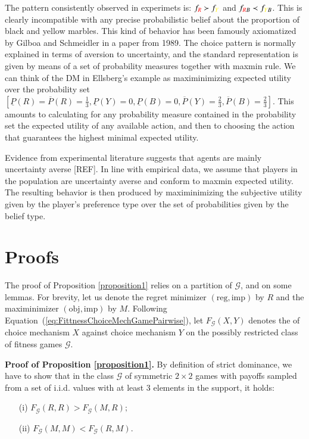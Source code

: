 \documentclass[fleqn,reqno,11pt]{article}
\begin{document}
The pattern consistently observed in experimets is:
$f_{{\color{red}R}} \succ f_{{\color{yellow}Y}}$ and
$f_{{\color{red}R}B} \prec f_{{\color{yellow}Y}B}$. This is clearly incompatible with any
precise probabilistic belief about the proportion of black and yellow marbles. This kind of
behavior has been famously axiomatized by Gilboa and Schmeidler in a paper from 1989. The
choice pattern is normally explained in terms of aversion to uncertainty, and the standard
representation is given by means of a set of probability measures together with maxmin rule. We
can think of the DM in Ellsberg's example as maximinimizing expected utility over the
probability set
$
[\underline{P}(R)=\overline{P}(R)=\frac{1}{3},\underline{P}(Y)=0,\underline{P}(B)=0,\overline{P}(Y)=\frac{2}{3},\overline{P}(B)=\frac{2}{3}]
$.
This amounts to calculating for any probability measure contained in the probability set the
expected utility of any available action, and then to choosing the action that guarantees the
highest minimal expected utility. 

Evidence from experimental literature suggests that agents are mainly uncertainty averse
[REF]. In line with empirical data, we assume that players in the population are uncertainty
averse and conform to maxmin expected utility. The resulting behavior is then produced by
maximinimizing the subjective utility given by the player's preference type over the set of
probabilities given by the belief type.


\section{Proofs}
\label{sec:proofs}

The proof of Proposition \ref{proposition1} relies on a partition of $\mathcal{G}$, and on some
lemmas. For brevity, let us denote the regret minimizer $(\text{reg}, \text{imp})$ by $R$ and
the maximinimizer $(\text{obj}, \text{imp})$ by $M$. Following
Equation~(\ref{eq:FittnessChoiceMechGamePairwise}), let $F_{\mathcal{G}}(X,Y)$ denotes the of
choice mechanism $X$ against choice mechanism $Y$ on the possibly restricted class of fitness
games $\mathcal{G}$.

\vspace{.5cm}


\noindent \textbf{Proof of Proposition \ref{proposition1}.} By definition of strict dominance,
we have to show that in the class $\mathcal{G}$ of symmetric $2\times2$ games with payoffs
sampled from a set of i.i.d. values with at least 3 elements in the support, it holds:
\begin{multicols}{2}
  \begin{itemize}
  \item[(i)] $F_{\mathcal{G}}(R,R)>F_{\mathcal{G}}(M,R);$
  \item[(ii)] $F_{\mathcal{G}}(M,M)<F_{\mathcal{G}}(R,M).$
  \end{itemize}
\end{multicols}
\end{document}
